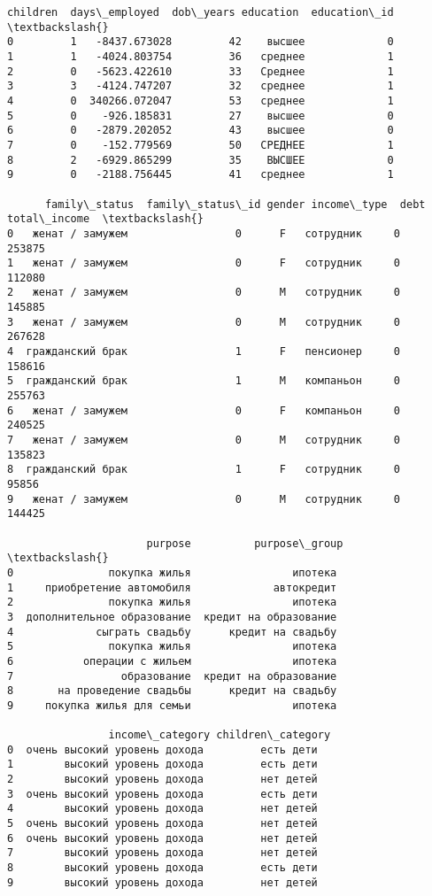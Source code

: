 \documentclass[11pt]{article}
\newcommand{\prompt}[4]{
        \llap{{\color{#2}[#3]: #4}}\vspace{-1.25em}
    }
\begin{document}
            \begin{tcolorbox}[breakable, boxrule=.5pt, size=fbox, pad at break*=1mm, opacityfill=0]
\prompt{Out}{outcolor}{36}{\hspace{3.5pt}}
\begin{Verbatim}[commandchars=\\\{\}]
   children  days\_employed  dob\_years education  education\_id  \textbackslash{}
0         1   -8437.673028         42    высшее             0
1         1   -4024.803754         36   среднее             1
2         0   -5623.422610         33   Среднее             1
3         3   -4124.747207         32   среднее             1
4         0  340266.072047         53   среднее             1
5         0    -926.185831         27    высшее             0
6         0   -2879.202052         43    высшее             0
7         0    -152.779569         50   СРЕДНЕЕ             1
8         2   -6929.865299         35    ВЫСШЕЕ             0
9         0   -2188.756445         41   среднее             1

      family\_status  family\_status\_id gender income\_type  debt  total\_income  \textbackslash{}
0   женат / замужем                 0      F   сотрудник     0        253875
1   женат / замужем                 0      F   сотрудник     0        112080
2   женат / замужем                 0      M   сотрудник     0        145885
3   женат / замужем                 0      M   сотрудник     0        267628
4  гражданский брак                 1      F   пенсионер     0        158616
5  гражданский брак                 1      M   компаньон     0        255763
6   женат / замужем                 0      F   компаньон     0        240525
7   женат / замужем                 0      M   сотрудник     0        135823
8  гражданский брак                 1      F   сотрудник     0         95856
9   женат / замужем                 0      M   сотрудник     0        144425

                      purpose          purpose\_group  \textbackslash{}
0               покупка жилья                ипотека
1     приобретение автомобиля             автокредит
2               покупка жилья                ипотека
3  дополнительное образование  кредит на образование
4             сыграть свадьбу      кредит на свадьбу
5               покупка жилья                ипотека
6           операции с жильем                ипотека
7                 образование  кредит на образование
8       на проведение свадьбы      кредит на свадьбу
9     покупка жилья для семьи                ипотека

                income\_category children\_category
0  очень высокий уровень дохода         есть дети
1        высокий уровень дохода         есть дети
2        высокий уровень дохода         нет детей
3  очень высокий уровень дохода         есть дети
4        высокий уровень дохода         нет детей
5  очень высокий уровень дохода         нет детей
6  очень высокий уровень дохода         нет детей
7        высокий уровень дохода         нет детей
8        высокий уровень дохода         есть дети
9        высокий уровень дохода         нет детей
\end{Verbatim}
\end{tcolorbox}
        
\end{document}
